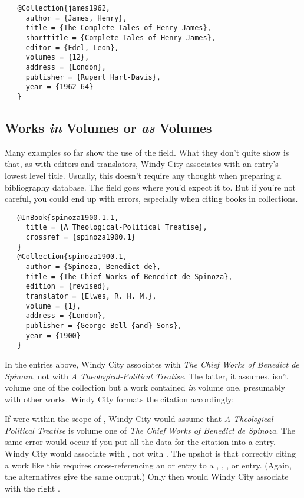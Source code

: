 \documentclass[11pt,letterpaper,oneside]{article}
\begin{document}
\begin{verbatim}
   @Collection{james1962,
     author = {James, Henry},
     title = {The Complete Tales of Henry James},
     shorttitle = {Complete Tales of Henry James},
     editor = {Edel, Leon},
     volumes = {12},
     address = {London},
     publisher = {Rupert Hart-Davis},
     year = {1962–64}
   }
\end{verbatim}

\subsection{Works \textit{in} Volumes or \textit{as} Volumes}

Many examples so far show the use of the  field. What
they don't quite show is that, as with editors and translators, Windy
City associates  with an entry's lowest level title.
Usually, this doesn't require any thought when preparing a
bibliography database. The  field goes where you'd
expect it to. But if you're not careful, you could end up with errors,
especially when citing books in collections.

\begin{verbatim}
   @InBook{spinoza1900.1.1,
     title = {A Theological-Political Treatise},
     crossref = {spinoza1900.1}
   }
   @Collection{spinoza1900.1,
     author = {Spinoza, Benedict de},
     title = {The Chief Works of Benedict de Spinoza},
     edition = {revised},
     translator = {Elwes, R. H. M.},
     volume = {1},
     address = {London},
     publisher = {George Bell {and} Sons},
     year = {1900}
   }
\end{verbatim}

In the entries above, Windy City associates  with
\textit{The Chief Works of Benedict de Spinoza}, not with \textit{A
Theological-Political Treatise}. The latter, it assumes, isn't volume
one of the collection but a work contained \textit{in} volume one,
presumably with other works. Windy City formats the citation
accordingly:

\begin{citebib}
\item \cite{spinoza1900.1.1}
\end{citebib}

\noindent If  were within the scope of
, Windy City would assume that \textit{A
Theological-Political Treatise} is volume one of \textit{The Chief
Works of Benedict de Spinoza}. The same error would occur if you put
all the data for the citation into a  entry.
Windy City would associate  with ,
not with . The upshot is that correctly citing a
work like this requires cross-referencing an  or
 entry to a , ,
, or  entry. (Again, the
alternatives give the same output.) Only then would Windy City
associate  with the right .
\end{document}
